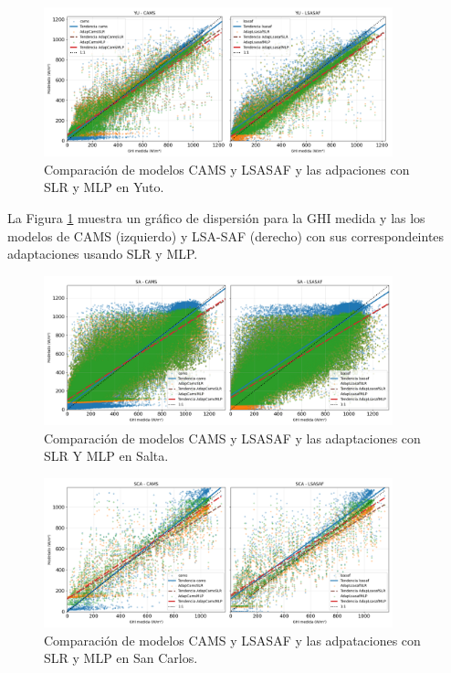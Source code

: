 \begin{figure}
    \centering
    \includegraphics[width=0.9\textwidth]{figuras/scatter_yu_1.png}
    \caption{Comparación de modelos CAMS y LSASAF y las adpaciones con SLR y MLP en Yuto.}
    \label{fig:scatter-yu-01}
\end{figure}


La Figura \ref{fig:scatter-yu-01} muestra un gráfico de dispersión para la GHI medida y las los modelos de CAMS (izquierdo) y LSA-SAF (derecho) con sus correspondeintes adaptaciones usando SLR y MLP.   


\begin{figure}
    \centering
    \includegraphics[width=0.9\textwidth]{figuras/scatter_sa_1.png}
    \caption{Comparación de modelos CAMS y LSASAF y las adaptaciones con SLR Y MLP en Salta.}
    \label{fig:scatter-sa-01}
\end{figure}


\begin{figure}
    \centering
    \includegraphics[width=0.9\textwidth]{figuras/scatter_sca_1.png}
    \caption{Comparación de modelos CAMS y LSASAF y las adpataciones con SLR y MLP en San Carlos.}
    \label{fig:scatter-sca-01}
\end{figure}


